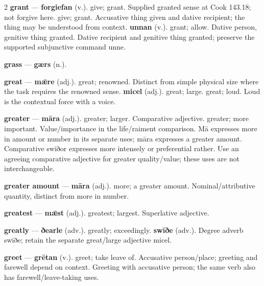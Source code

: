\begin{multicols}{2}
\textbf{grant} — \textbf{forgiefan} (v.). give; grant. Supplied granted sense at Cook 143.18; not forgive here. give; grant. Accusative thing given and dative recipient; the thing may be understood from context. \textbf{unnan} (v.). grant; allow. Dative person, genitive thing granted. Dative recipient and genitive thing granted; preserve the supported subjunctive command unne.\par
\textbf{grass} — \textbf{gærs} (n.).\par
\textbf{great} — \textbf{mǣre} (adj.). great; renowned. Distinct from simple physical size where the task requires the renowned sense. \textbf{micel} (adj.). great; large. great; loud. Loud is the contextual force with a voice.\par
\textbf{greater} — \textbf{māra} (adj.). greater; larger. Comparative adjective. greater; more important. Value/importance in the life/raiment comparison. Mā expresses more in amount or number in its separate uses; māra expresses a greater amount. Comparative swīðor expresses more intensely or preferential rather. Use an agreeing comparative adjective for greater quality/value; these uses are not interchangeable.\par
\textbf{greater amount} — \textbf{māra} (adj.). more; a greater amount. Nominal/attributive quantity, distinct from more in number.\par
\textbf{greatest} — \textbf{mǣst} (adj.). greatest; largest. Superlative adjective.\par
\textbf{greatly} — \textbf{ðearle} (adv.). greatly; exceedingly. \textbf{swīðe} (adv.). Degree adverb swīðe; retain the separate great/large adjective micel.\par
\textbf{greet} — \textbf{grētan} (v.). greet; take leave of. Accusative person/place; greeting and farewell depend on context. Greeting with accusative person; the same verb also has farewell/leave-taking uses.\par

\end{multicols}
